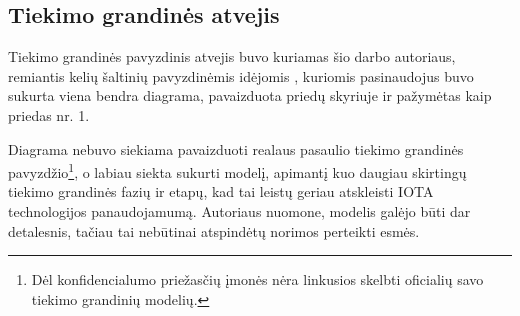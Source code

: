 \subsection{Tiekimo grandinės atvejis}

Tiekimo grandinės pavyzdinis atvejis buvo kuriamas šio darbo autoriaus, remiantis kelių šaltinių pavyzdinėmis idėjomis \cite{christopher2016logistics} \cite{webber2009building} \cite{patrick2017continuous} \cite{justin2016customer}, kuriomis pasinaudojus buvo sukurta viena bendra diagrama, pavaizduota priedų skyriuje ir pažymėtas kaip priedas nr. 1. 

Diagrama nebuvo siekiama pavaizduoti realaus pasaulio tiekimo grandinės pavyzdžio\footnote{Dėl konfidencialumo priežasčių įmonės nėra linkusios skelbti oficialių savo tiekimo grandinių modelių.}, o labiau siekta sukurti modelį, apimantį kuo daugiau skirtingų tiekimo grandinės fazių ir etapų, kad tai leistų geriau atskleisti IOTA technologijos panaudojamumą. Autoriaus nuomone, modelis galėjo būti dar detalesnis, tačiau tai nebūtinai atspindėtų norimos perteikti esmės.

